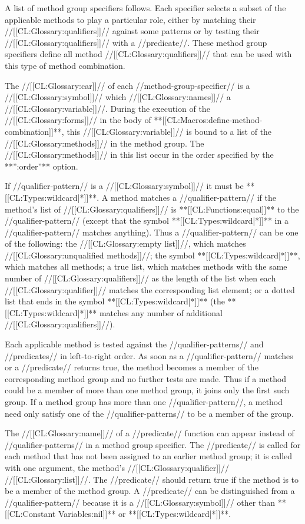 A list of method group specifiers follows. Each specifier selects a subset of the applicable methods to play a particular role, either by matching their //[[CL:Glossary:qualifiers]]// against some patterns or by testing their //[[CL:Glossary:qualifiers]]// with a //predicate//. These method group specifiers define all method //[[CL:Glossary:qualifiers]]// that can be used with this type of method combination.




The //[[CL:Glossary:car]]// of each //method-group-specifier// is a //[[CL:Glossary:symbol]]// which //[[CL:Glossary:names]]// a //[[CL:Glossary:variable]]//. During the execution of the //[[CL:Glossary:forms]]// in the body of **[[CL:Macros:define-method-combination]]**, this //[[CL:Glossary:variable]]// is bound to a list of the //[[CL:Glossary:methods]]// in the method group. The //[[CL:Glossary:methods]]// in this list occur in the order specified by the **'':order''** option.

If //qualifier-pattern// is a //[[CL:Glossary:symbol]]// it must be **[[CL:Types:wildcard|*]]**. A method matches a //qualifier-pattern// if the method's list of //[[CL:Glossary:qualifiers]]// is **[[CL:Functions:equal]]** to the //qualifier-pattern// (except that the symbol **[[CL:Types:wildcard|*]]** in a //qualifier-pattern// matches anything). Thus a //qualifier-pattern// can be one of the following: the //[[CL:Glossary:empty list]]//, which matches //[[CL:Glossary:unqualified methods]]//; the symbol **[[CL:Types:wildcard|*]]**, which matches all methods; a true list, which matches methods with the same number of //[[CL:Glossary:qualifiers]]// as the length of the list when each //[[CL:Glossary:qualifier]]// matches the corresponding list element; or a dotted list that ends in the symbol **[[CL:Types:wildcard|*]]** (the **[[CL:Types:wildcard|*]]** matches any number of additional //[[CL:Glossary:qualifiers]]//).


Each applicable method is tested against the //qualifier-patterns// and //predicates// in left-to-right order. As soon as a //qualifier-pattern// matches or a //predicate// returns true, the method becomes a member of the corresponding method group and no further tests are made. Thus if a method could be a member of more than one method group, it joins only the first such group. If a method group has more than one //qualifier-pattern//, a method need only satisfy one of the //qualifier-patterns// to be a member of the group.

The //[[CL:Glossary:name]]// of a //predicate// function can appear instead of //qualifier-patterns// in a method group specifier. The //predicate// is called for each method that has not been assigned to an earlier method group; it is called with one argument, the method's //[[CL:Glossary:qualifier]]// //[[CL:Glossary:list]]//. The //predicate// should return true if the method is to be a member of the method group. A //predicate// can be distinguished from a //qualifier-pattern// because it is a //[[CL:Glossary:symbol]]// other than **[[CL:Constant Variables:nil]]** or **[[CL:Types:wildcard|*]]**.



